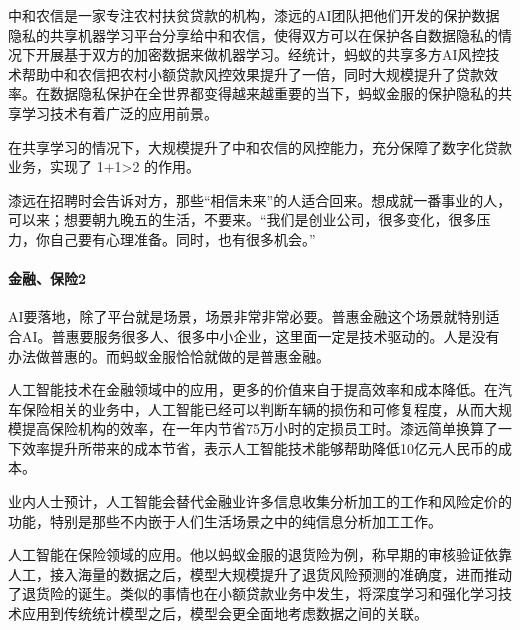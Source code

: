 \documentclass[letterpaper,10pt,english]{sphinxmanual}
\begin{document}
中和农信是一家专注农村扶贫贷款的机构，漆远的AI团队把他们开发的保护数据隐私的共享机器学习平台分享给中和农信，使得双方可以在保护各自数据隐私的情况下开展基于双方的加密数据来做机器学习。经统计，蚂蚁的共享多方AI风控技术帮助中和农信把农村小额贷款风控效果提升了一倍，同时大规模提升了贷款效率。在数据隐私保护在全世界都变得越来越重要的当下，蚂蚁金服的保护隐私的共享学习技术有着广泛的应用前景。

在共享学习的情况下，大规模提升了中和农信的风控能力，充分保障了数字化贷款业务，实现了
1+1>2 的作用。

漆远在招聘时会告诉对方，那些“相信未来”的人适合回来。想成就一番事业的人，可以来；想要朝九晚五的生活，不要来。“我们是创业公司，很多变化，很多压力，你自己要有心理准备。同时，也有很多机会。”


\paragraph{金融、保险2\sphinxfootnotemark[1082]}
\label{\detokenize{chapter_AI_expert/qi_yuan:id6}}%
\begin{footnotetext}[1082]\sphinxAtStartFootnote
{}
%
\end{footnotetext}\ignorespaces 
AI要落地，除了平台就是场景，场景非常非常必要。普惠金融这个场景就特别适合AI。普惠要服务很多人、很多中小企业，这里面一定是技术驱动的。人是没有办法做普惠的。而蚂蚁金服恰恰就做的是普惠金融。

人工智能技术在金融领域中的应用，更多的价值来自于提高效率和成本降低。在汽车保险相关的业务中，人工智能已经可以判断车辆的损伤和可修复程度，从而大规模提高保险机构的效率，在一年内节省75万小时的定损员工时。漆远简单换算了一下效率提升所带来的成本节省，表示人工智能技术能够帮助降低10亿元人民币的成本。

业内人士预计，人工智能会替代金融业许多信息收集分析加工的工作和风险定价的功能，特别是那些不内嵌于人们生活场景之中的纯信息分析加工工作。%
\begin{footnote}[1083]\sphinxAtStartFootnote
{}
%
\end{footnote}

人工智能在保险领域的应用。他以蚂蚁金服的退货险为例，称早期的审核验证依靠人工，接入海量的数据之后，模型大规模提升了退货风险预测的准确度，进而推动了退货险的诞生。类似的事情也在小额贷款业务中发生，将深度学习和强化学习技术应用到传统统计模型之后，模型会更全面地考虑数据之间的关联。
\end{document}
